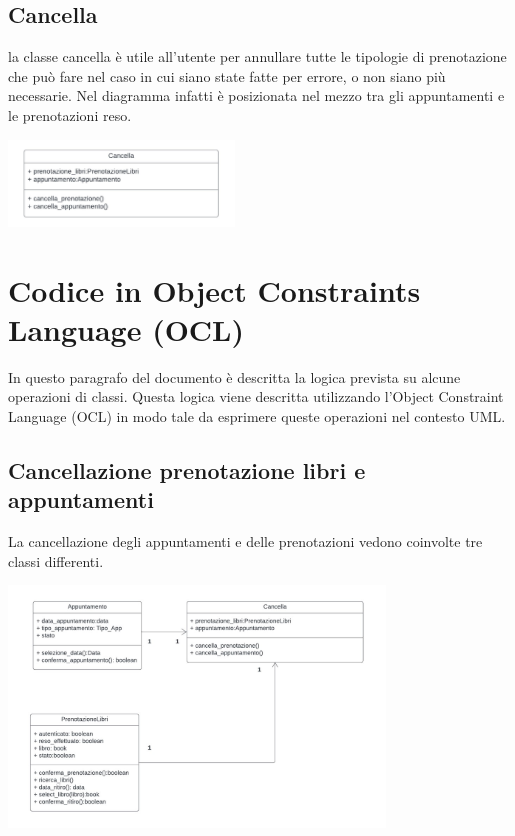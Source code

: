 \documentclass{article}
\begin{document}
\subsection{Cancella}
la classe cancella è utile all’utente per annullare tutte le tipologie di prenotazione che può fare nel caso in cui siano state fatte per errore, o non siano più necessarie. Nel diagramma infatti è posizionata nel mezzo tra gli appuntamenti e le prenotazioni reso.
\begin{center}
        \includegraphics[width=60mm]{D3/Images/Cancella.jpg}
\end{center}

\section{Codice in Object Constraints Language (OCL)}

In questo paragrafo del documento è descritta la logica prevista su alcune operazioni di classi. Questa logica viene descritta utilizzando l’Object Constraint Language (OCL) in modo tale da esprimere queste operazioni nel contesto UML.

\subsection{Cancellazione prenotazione libri e appuntamenti}
La cancellazione degli appuntamenti e delle prenotazioni vedono coinvolte tre classi differenti.
\begin{center}
        \includegraphics[width=100mm]{D3/Images/Canc_Prenot_App.jpg}
\end{center}
\end{document}
